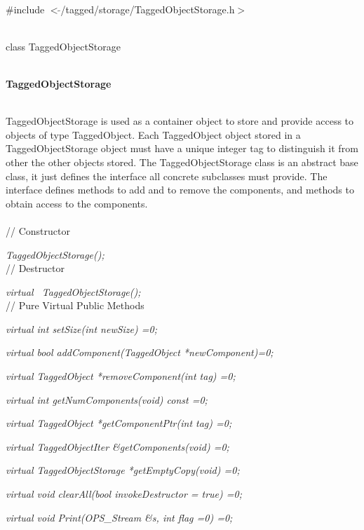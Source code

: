 
   \\
\#include $<\tilde{ }$/tagged/storage/TaggedObjectStorage.h$>$ 


  \\
class TaggedObjectStorage  


 \\
 {\bf TaggedObjectStorage} 


  \\
\indent TaggedObjectStorage is used as a container object to store and
provide access to objects of type TaggedObject. Each TaggedObject
object stored in a TaggedObjectStorage object must have a unique
integer tag to distinguish it from other the other objects stored. The
TaggedObjectStorage class is an abstract base class, it just defines
the interface all concrete subclasses must provide. The interface
defines methods to add and to remove the components, and methods to
obtain access to the components. \\

  \\
// Constructor  

{\em TaggedObjectStorage();} \\

// Destructor 

{\em virtual  ~TaggedObjectStorage();} \\  

// Pure Virtual Public Methods 

{\em virtual int  setSize(int newSize) =0;}

{\em virtual bool addComponent(TaggedObject *newComponent)=0;}

{\em virtual TaggedObject *removeComponent(int tag) =0;}

{\em virtual int getNumComponents(void) const =0;}

{\em virtual TaggedObject *getComponentPtr(int tag) =0;}

{\em virtual TaggedObjectIter \&getComponents(void) =0;}

{\em virtual TaggedObjectStorage *getEmptyCopy(void) =0;}

{\em virtual void clearAll(bool invokeDestructor = true) =0;}

{\em virtual void Print(OPS_Stream \&s, int flag =0) =0;}


